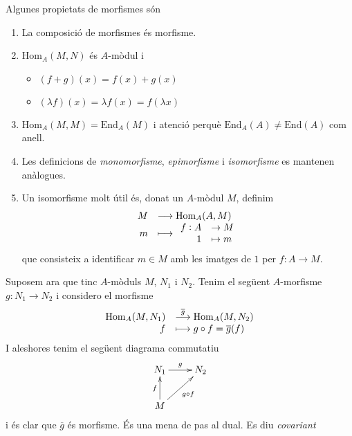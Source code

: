 \documentclass[../../../main.tex]{subfiles}
\begin{document}
\begin{prop}
\label{prop:propietatsmorfismes} Algunes propietats de morfismes són
\begin{enumerate}[(1)]
    \item La composició de morfismes és morfisme.
    \item $\mathrm{Hom}_A(M,N)$ és $A$-mòdul i 
    \begin{itemize}
        \item $(f+g)(x) = f(x)+g(x)$
        \item $(\lambda f)(x) = \lambda f(x) = f(\lambda x)$
    \end{itemize}
    \item $\mathrm{Hom}_A(M,M) = \mathrm{End}_A(M)$ i atenció perquè $\mathrm{End}_A(A)\not= \mathrm{End}(A)$ com anell.
    \item Les definicions de \textit{monomorfisme}, \textit{epimorfisme} i \textit{isomorfisme} es mantenen anàlogues. 
    \item Un isomorfisme molt útil és, donat un $A$-mòdul $M$, definim
    \begin{equation}
        \notag
        \begin{array}{rl}
            M & \longrightarrow \mathrm{Hom}_A(A,M) \\
            m & \longmapsto \begin{array}{rl}
                f:A & \rightarrow M \\
                1 & \mapsto m
            \end{array}
        \end{array}
    \end{equation}
    que consisteix a identificar $m\in M$ amb les imatges de $1$ per $f:A\to M$.
\end{enumerate}
\end{prop}


Suposem ara que tinc $A$-mòduls $M$, $N_1$ i $N_2$. Tenim el següent $A$-morfisme $g:N_1\to N_2$ i considero el morfisme
\begin{equation}
    \notag
    \begin{array}{rl}
        \mathrm{Hom}_A(M,N_1) & \overset{\overline{g}}{\longrightarrow} \mathrm{Hom}_A(M,N_2) \\
        f & \longmapsto g\circ f = \overline{g}(f)
    \end{array}
\end{equation}
I aleshores tenim el següent diagrama commutatiu
\begin{equation}
    \notag
    \xymatrix{
    N_1\ar[r]^g & N_2\\
    M\ar[u]^f\ar[ur]_{g\circ f}
    }
\end{equation}
i és clar que $\overline{g}$ és morfisme. És una mena de pas al dual. Es diu \textit{covariant}
\end{document}
